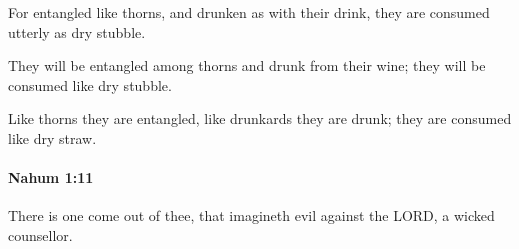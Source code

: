 			\begin{versebox}
					\item[BHS] 
					\item[LXX] 
					\item[ASV] For entangled like thorns, and drunken as with their drink, they are consumed utterly as dry stubble.
					\item[NIV] They will be entangled among thorns and drunk from their wine; they will be consumed like dry stubble.
					\item[NRSV] Like thorns they are entangled, like drunkards they are drunk; they are consumed like dry straw.
			\end{versebox}

		\paragraph{Nahum 1:11} %
			\label{NAHUM-1-11}

			There is one come out of thee, that imagineth evil against the LORD, a wicked counsellor.

